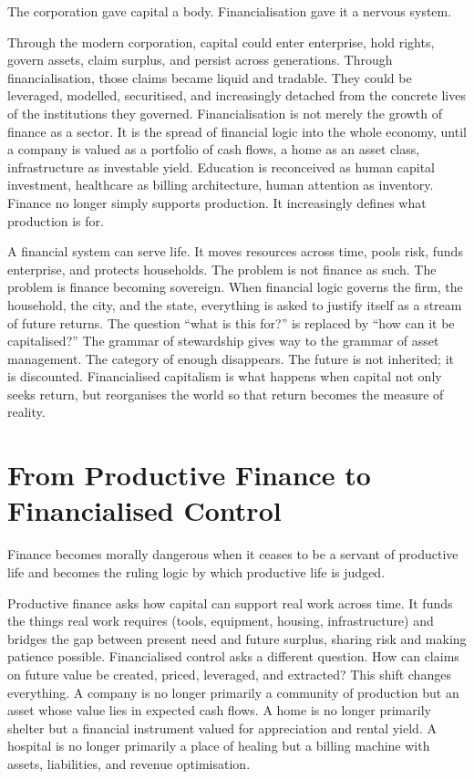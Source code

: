 \documentclass[11pt,a4paper,oneside]{book}
\begin{document}
The corporation gave capital a body. Financialisation gave it a nervous system.

Through the modern corporation, capital could enter enterprise, hold rights, govern assets, claim surplus, and persist across generations. Through financialisation, those claims became liquid and tradable. They could be leveraged, modelled, securitised, and increasingly detached from the concrete lives of the institutions they governed. Financialisation is not merely the growth of finance as a sector. It is the spread of financial logic into the whole economy, until a company is valued as a portfolio of cash flows, a home as an asset class, infrastructure as investable yield. Education is reconceived as human capital investment, healthcare as billing architecture, human attention as inventory. Finance no longer simply supports production. It increasingly defines what production is for.

A financial system can serve life. It moves resources across time, pools risk, funds enterprise, and protects households. The problem is not finance as such. The problem is finance becoming sovereign. When financial logic governs the firm, the household, the city, and the state, everything is asked to justify itself as a stream of future returns. The question ``what is this for?'' is replaced by ``how can it be capitalised?'' The grammar of stewardship gives way to the grammar of asset management. The category of enough disappears. The future is not inherited; it is discounted. Financialised capitalism is what happens when capital not only seeks return, but reorganises the world so that return becomes the measure of reality.

\section*{From Productive Finance to Financialised Control}

Finance becomes morally dangerous when it ceases to be a servant of productive life and becomes the ruling logic by which productive life is judged.

Productive finance asks how capital can support real work across time. It funds the things real work requires (tools, equipment, housing, infrastructure) and bridges the gap between present need and future surplus, sharing risk and making patience possible. Financialised control asks a different question. How can claims on future value be created, priced, leveraged, and extracted? This shift changes everything. A company is no longer primarily a community of production but an asset whose value lies in expected cash flows. A home is no longer primarily shelter but a financial instrument valued for appreciation and rental yield. A hospital is no longer primarily a place of healing but a billing machine with assets, liabilities, and revenue optimisation.
\end{document}
